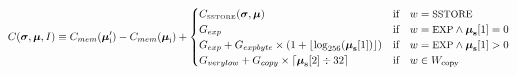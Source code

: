 \documentclass[9pt,oneside]{amsart}
\begin{document}
\nopagebreak
\begin{equation}
C(\boldsymbol{\sigma}, \boldsymbol{\mu}, I) \equiv C_{mem}(\boldsymbol{\mu}'_{\mathrm{i}})-C_{mem}(\boldsymbol{\mu}_{\mathrm{i}}) + \begin{cases}
C_\text{\tiny SSTORE}(\boldsymbol{\sigma}, \boldsymbol{\mu}) & \text{if} \quad w = \text{\small SSTORE} \\
G_{exp} & \text{if} \quad w = \text{\small EXP} \wedge \boldsymbol{\mu}_{\mathbf{s}}[1] = 0 \\
G_{exp} + G_{expbyte}\times(1+\lfloor\log_{256}(\boldsymbol{\mu}_{\mathbf{s}}[1])\rfloor) & \text{if} \quad w = \text{\small EXP} \wedge \boldsymbol{\mu}_{\mathbf{s}}[1] > 0 \\
G_{verylow} + G_{copy}\times\lceil\boldsymbol{\mu}_{\mathbf{s}}[2] \div 32\rceil & \text{if} \quad w \in W_{\mathrm{copy}} \\


\end{cases}
\end{equation}
\end{document}
